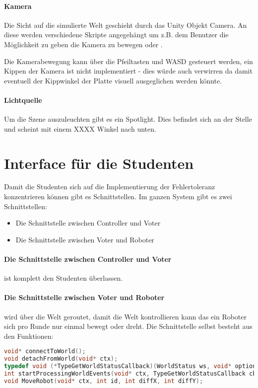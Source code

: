 \documentclass[
    12pt,
    bibliography=totoc,
    ngerman
]{scrartcl}
\begin{document}
\paragraph{Kamera} Die Sicht auf die simulierte Welt geschieht durch das Unity Objekt Camera. An diese werden verschiedene Skripte angegeh{\"{a}}ngt um z.B. dem Benutzer die M{\"{o}}glichkeit zu
geben die Kamera zu bewegen oder .

Die Kamerabewegung kann {\"{u}}ber die Pfeiltasten und WASD gesteuert werden, ein Kippen der Kamera ist nicht implementiert - dies w{\"{u}}rde auch verwirren da damit eventuell der Kippwinkel der
Platte visuell ausgeglichen werden k{\"{o}}nnte.

\paragraph{Lichtquelle} Um die Szene auszuleuchten gibt es ein Spotlight. Dies befindet sich an der Stelle  und scheint mit einem XXXX \textdegree Winkel nach unten.


\clearpage
\section{Interface f{\"{u}}r die Studenten}\label{interface}
Damit die Studenten sich auf die Implementierung der Fehlertoleranz konzentrieren k{\"{o}}nnen gibt es Schnittstellen.
Im ganzen System gibt es zwei Schnittstellen:
\begin{itemize}
\item Die Schnittstelle zwischen Controller und Voter
\item Die Schnittstelle zwischen Voter und Roboter
\end{itemize}

\paragraph{Die Schnittstelle zwischen Controller und Voter} ist komplett den Studenten {\"{u}}berlassen.

\paragraph{Die Schnittstelle zwischen Voter und Roboter} wird {\"{u}}ber die Welt geroutet, damit die Welt kontrollieren kann das ein
Roboter sich pro Runde nur einmal bewegt oder dreht. Die Schnittstelle selbst besteht aus den Funktionen:
\begin{lstlisting}[frame=single, language=c] 
void* connectToWorld();
void detachFromWorld(void* ctx);
typedef void (*TypeGetWorldStatusCallback)(WorldStatus ws, void* optional);
int startProcessingWorldEvents(void* ctx, TypeGetWorldStatusCallback cb, void* optional);
void MoveRobot(void* ctx, int id, int diffX, int diffY);
\end{lstlisting}
\end{document}

